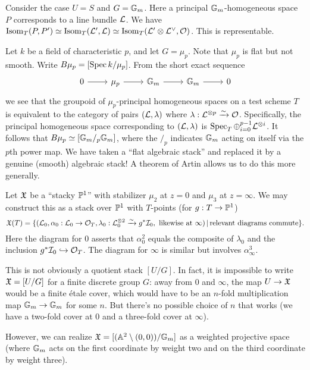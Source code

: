 \documentclass{amsart}
\begin{document}
\begin{ex}
	Consider the case $U = S$ and $G = \mathbb{G}_m$.
	Here a principal $\mathbb{G}_m$-homogeneous space $P$ corresponds to a line bundle $\mathcal{L}$.
	We have $\operatorname{Isom}_T(P, P') \simeq \operatorname{Isom}_T(\mathcal{L}', \mathcal{L}) \simeq \operatorname{Isom}_T(\mathcal{L}' \otimes \mathcal{L}^\vee, \mathcal{O})$.
	This is representable.
\end{ex}

\begin{ex}
	Let $k$ be a field of characteristic $p$, and let $G = \mu_p$.
	Note that $\mu_p$ is flat but not smooth.
	Write $B\mu_p = [\operatorname{Spec} k / \mu_p]$.
	From the short exact sequence
	\[
		\SES{\mu_p}{\GG_m}{\GG_m}
	\]
	we see that the groupoid of $\mu_p$-principal homogeneous spaces on a test scheme $T$ is equivalent to the category of pairs $(\mathcal{L}, \lambda)$ where $\lambda: \mathcal{L}^{\otimes p} \xrightarrow{\sim} \mathcal{O}$.
	Specifically, the principal homogeneous space corresponding to $(\mathcal{L}, \lambda)$ is $\operatorname{Spec}_T \oplus_{i=0}^{p-1} \mathcal{L}^{\otimes i}$.
	It follows that $B \mu_p \simeq [\mathbb{G}_m /_p \mathbb{G}_m]$, where the $/_p$ indicates $\mathbb{G}_m$ acting on itself via the $p$th power map.
	We have taken a ``flat algebraic stack'' and replaced it by a genuine (smooth) algebraic stack!
	A theorem of Artin allows us to do this more generally.
\end{ex}

\begin{ex}
	Let $\mathfrak{X}$ be a ``stacky $\mathbb{P}^1$'' with stabilizer $\mu_2$ at $z = 0$ and $\mu_3$ at $z = \infty$.
	We may construct this as a stack over $\mathbb{P}^1$ with $T$-points (for $g: T \to \mathbb{P}^1$)
	\[
		\mathfrak{X}(T) = \{ (\mathcal{L}_0, \alpha_0: \mathcal{L}_0 \to \mathcal{O}_T, \lambda_0: \mathcal{L}_0^{\otimes 2} \xrightarrow{\sim} g^* \mathcal{I}_0, \textrm{ likewise at $\infty$}) \,|\, \textrm{relevant diagrams commute}\}.
	\]
	Here the diagram for $0$ asserts that $\alpha_0^2$ equals the composite of $\lambda_0$ and the inclusion $g^* \mathcal{I}_0 \hookrightarrow \mathcal{O}_T$.
	The diagram for $\infty$ is similar but involves $\alpha_\infty^3$.

	This is not obviously a quotient stack $[U / G]$.
	In fact, it is impossible to write $\mathfrak{X} = [U / G]$ for a finite discrete group $G$: away from $0$ and $\infty$, the map $U \to \mathfrak{X}$ would be a finite \'etale cover, which would have to be an $n$-fold multiplication map $\mathbb{G}_m \to \mathbb{G}_m$ for some $n$.
	But there's no possible choice of $n$ that works (we have a two-fold cover at $0$ and a three-fold cover at $\infty$).

	However, we can realize $\mathfrak{X} = [(\mathbb{A}^2 \setminus (0, 0)) / \mathbb{G}_m]$ as a weighted projective space (where $\mathbb{G}_m$ acts on the first coordinate by weight two and on the third coordinate by weight three).
\end{ex}
\end{document}
